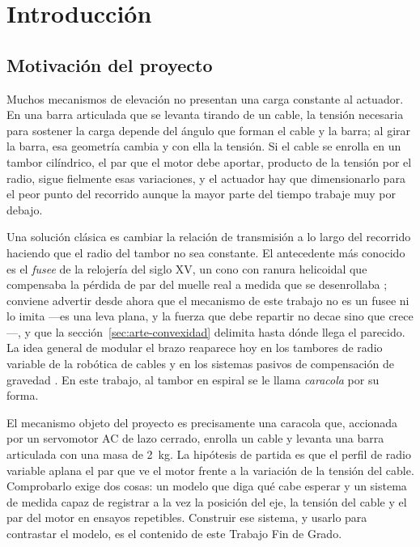 \chapter{Introducción}
\label{chap:intro}

\section{Motivación del proyecto}

Muchos mecanismos de elevación no presentan una carga constante al actuador. En una barra
articulada que se levanta tirando de un cable, la tensión necesaria para sostener la carga depende
del ángulo que forman el cable y la barra; al girar la barra, esa geometría cambia y con ella la
tensión. Si el cable se enrolla en un tambor cilíndrico, el par que el motor debe aportar, producto
de la tensión por el radio, sigue fielmente esas variaciones, y el actuador hay que dimensionarlo
para el peor punto del recorrido aunque la mayor parte del tiempo trabaje muy por debajo.

Una solución clásica es cambiar la relación de transmisión a lo largo del recorrido haciendo que el
radio del tambor no sea constante. El antecedente más conocido es el \emph{fusee} de la relojería
del siglo XV, un cono con ranura helicoidal que compensaba la pérdida de par del muelle real a
medida que se desenrollaba \cite{landes1983}; conviene advertir desde ahora que el mecanismo de este
trabajo no es un fusee ni lo imita ---es una leva plana, y la fuerza que debe repartir no decae sino
que crece---, y que la sección~\ref{sec:arte-convexidad} delimita hasta dónde llega el parecido. La
idea general de modular el brazo reaparece hoy en los tambores de radio variable de la robótica de
cables \cite{seriani2016,bieber2023,arsenault2018} y en los sistemas pasivos de compensación de
gravedad \cite{shen2022,endo2010}. En este trabajo, al tambor en espiral se le llama \emph{caracola}
por su forma.

El mecanismo objeto del proyecto es precisamente una caracola que, accionada por un servomotor AC de
lazo cerrado, enrolla un cable y levanta una barra articulada con una masa de
\SI{2}{\kilo\gram}. La hipótesis de partida es que el perfil de radio variable aplana el par que ve
el motor frente a la variación de la tensión del cable. Comprobarlo exige dos cosas: un modelo que
diga qué cabe esperar y un sistema de medida capaz de registrar a la vez la posición del eje, la
tensión del cable y el par del motor en ensayos repetibles. Construir ese sistema, y usarlo para
contrastar el modelo, es el contenido de este Trabajo Fin de Grado.

